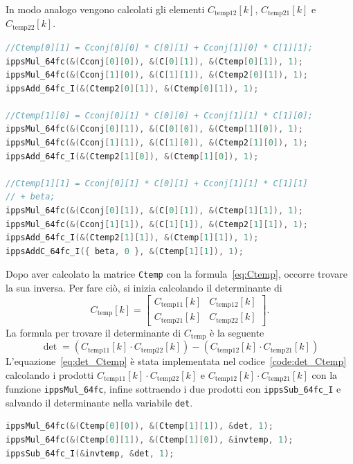 \documentclass[12pt,a4paper,titlepage]{article}
\begin{document}
In modo analogo vengono calcolati gli elementi $C_{\text{temp12}}[k]$, $C_{\text{temp21}}[k]$ e $C_{\text{temp22}}[k]$.
\begin{lstlisting}[language=cpp, label=code:ctemp, caption = Implementazione della matrice \texttt{Ctemp}, breaklines = false, captionpos = b]
//Ctemp[0][1] = Cconj[0][0] * C[0][1] + Cconj[1][0] * C[1][1];
ippsMul_64fc(&(Cconj[0][0]), &(C[0][1]), &(Ctemp[0][1]), 1);
ippsMul_64fc(&(Cconj[1][0]), &(C[1][1]), &(Ctemp2[0][1]), 1);
ippsAdd_64fc_I(&(Ctemp2[0][1]), &(Ctemp[0][1]), 1);

//Ctemp[1][0] = Cconj[0][1] * C[0][0] + Cconj[1][1] * C[1][0];
ippsMul_64fc(&(Cconj[0][1]), &(C[0][0]), &(Ctemp[1][0]), 1);
ippsMul_64fc(&(Cconj[1][1]), &(C[1][0]), &(Ctemp2[1][0]), 1);
ippsAdd_64fc_I(&(Ctemp2[1][0]), &(Ctemp[1][0]), 1);

//Ctemp[1][1] = Cconj[0][1] * C[0][1] + Cconj[1][1] * C[1][1]
// + beta;
ippsMul_64fc(&(Cconj[0][1]), &(C[0][1]), &(Ctemp[1][1]), 1);
ippsMul_64fc(&(Cconj[1][1]), &(C[1][1]), &(Ctemp2[1][1]), 1);
ippsAdd_64fc_I(&(Ctemp2[1][1]), &(Ctemp[1][1]), 1);
ippsAddC_64fc_I({ beta, 0 }, &(Ctemp[1][1]), 1);
\end{lstlisting}
Dopo aver calcolato la matrice \texttt{Ctemp} con la formula~\eqref{eq:Ctemp}, occorre trovare la sua inversa. Per fare ciò, si inizia calcolando il determinante di 
\begin{equation*}
C_{\text{temp}}[k] = 
\begin{bmatrix}
C_{\text{temp11}}[k]	& 	C_{\text{temp12}}[k]\\
C_{\text{temp21}}[k]	& 	C_{\text{temp22}}[k]
\end{bmatrix}.
\end{equation*}
La formula per trovare il determinante di $C_{\text{temp}}$ è la seguente
\begin{equation}\label{eq:det_Ctemp}
\det = \left(C_{\text{temp11}}[k] \cdot C_{\text{temp22}}[k]\right) - \left(C_{\text{temp12}}[k] \cdot C_{\text{temp21}}[k]\right)
\end{equation}
L'equazione~\eqref{eq:det_Ctemp} è stata implementata nel codice~\ref{code:det_Ctemp} calcolando i prodotti $C_{\text{temp11}}[k] \cdot C_{\text{temp22}}[k]$ e $C_{\text{temp12}}[k] \cdot C_{\text{temp21}}[k]$ con la funzione \texttt{ippsMul\_64fc}, infine sottraendo i due prodotti con \texttt{ippsSub\_64fc\_I} e salvando il determinante nella variabile \texttt{det}.
\begin{lstlisting}[language=cpp, label=code:det_Ctemp, caption = Calcolo del determinante della matrice \texttt{Ctemp}, breaklines = false, captionpos = b]
ippsMul_64fc(&(Ctemp[0][0]), &(Ctemp[1][1]), &det, 1);
ippsMul_64fc(&(Ctemp[0][1]), &(Ctemp[1][0]), &invtemp, 1);
ippsSub_64fc_I(&invtemp, &det, 1);
\end{lstlisting}
\end{document}
